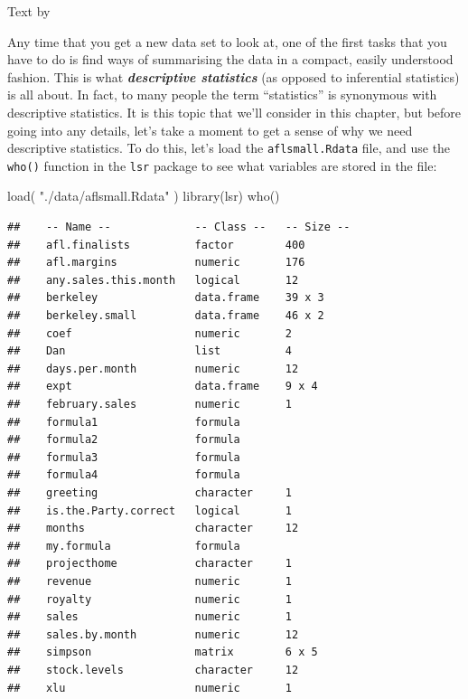 \documentclass[
]{book}
\newenvironment{Shaded}{\begin{snugshade}}{\end{snugshade}}
\newcommand{\FunctionTok}[1]{\textcolor[rgb]{0.00,0.00,0.00}{#1}}
\newcommand{\NormalTok}[1]{#1}
\newcommand{\StringTok}[1]{\textcolor[rgb]{0.31,0.60,0.02}{#1}}
\begin{document}
Text by \citet{Navarro2018}

Any time that you get a new data set to look at, one of the first tasks that you have to do is find ways of summarising the data in a compact, easily understood fashion. This is what \textbf{\emph{descriptive statistics}} (as opposed to inferential statistics) is all about. In fact, to many people the term ``statistics'' is synonymous with descriptive statistics. It is this topic that we'll consider in this chapter, but before going into any details, let's take a moment to get a sense of why we need descriptive statistics. To do this, let's load the \texttt{aflsmall.Rdata} file, and use the \texttt{who()} function in the \texttt{lsr} package to see what variables are stored in the file:

\begin{Shaded}
\begin{Highlighting}[]
\FunctionTok{load}\NormalTok{( }\StringTok{"./data/aflsmall.Rdata"}\NormalTok{ )}
\FunctionTok{library}\NormalTok{(lsr)}
\FunctionTok{who}\NormalTok{()}
\end{Highlighting}
\end{Shaded}

\begin{verbatim}
##    -- Name --             -- Class --   -- Size --
##    afl.finalists          factor        400       
##    afl.margins            numeric       176       
##    any.sales.this.month   logical       12        
##    berkeley               data.frame    39 x 3    
##    berkeley.small         data.frame    46 x 2    
##    coef                   numeric       2         
##    Dan                    list          4         
##    days.per.month         numeric       12        
##    expt                   data.frame    9 x 4     
##    february.sales         numeric       1         
##    formula1               formula                 
##    formula2               formula                 
##    formula3               formula                 
##    formula4               formula                 
##    greeting               character     1         
##    is.the.Party.correct   logical       1         
##    months                 character     12        
##    my.formula             formula                 
##    projecthome            character     1         
##    revenue                numeric       1         
##    royalty                numeric       1         
##    sales                  numeric       1         
##    sales.by.month         numeric       12        
##    simpson                matrix        6 x 5     
##    stock.levels           character     12        
##    xlu                    numeric       1
\end{verbatim}
\end{document}

